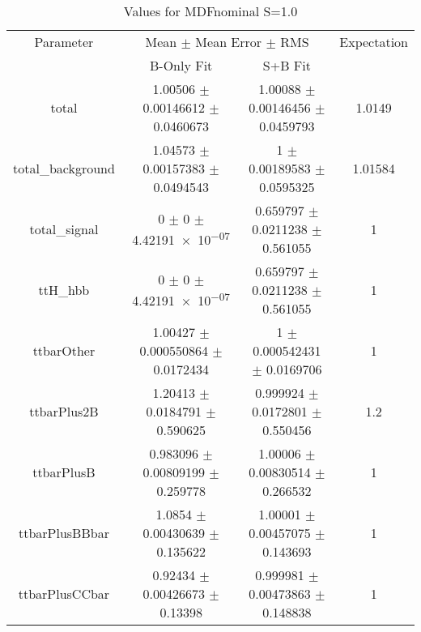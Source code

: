 \begin{table}
\centering
\caption{Values for MDFnominal S=1.0}
\begin{tabular}{cccc}
\toprule
Parameter & \multicolumn{2}{c}{Mean $\pm$ Mean Error $\pm$ RMS} & Expectation\\
 & B-Only Fit & S+B Fit & \\
\midrule
total & \num{1.00506} $\pm$ \num{0.00146612} $\pm$ \num{0.0460673} & \num{1.00088} $\pm$ \num{0.00146456} $\pm$ \num{0.0459793} & \num{1.0149}\\
total\_background & \num{1.04573} $\pm$ \num{0.00157383} $\pm$ \num{0.0494543} & \num{1} $\pm$ \num{0.00189583} $\pm$ \num{0.0595325} & \num{1.01584}\\
total\_signal & \num{0} $\pm$ \num{0} $\pm$ \num{4.42191e-07} & \num{0.659797} $\pm$ \num{0.0211238} $\pm$ \num{0.561055} & \num{1}\\
ttH\_hbb & \num{0} $\pm$ \num{0} $\pm$ \num{4.42191e-07} & \num{0.659797} $\pm$ \num{0.0211238} $\pm$ \num{0.561055} & \num{1}\\
ttbarOther & \num{1.00427} $\pm$ \num{0.000550864} $\pm$ \num{0.0172434} & \num{1} $\pm$ \num{0.000542431} $\pm$ \num{0.0169706} & \num{1}\\
ttbarPlus2B & \num{1.20413} $\pm$ \num{0.0184791} $\pm$ \num{0.590625} & \num{0.999924} $\pm$ \num{0.0172801} $\pm$ \num{0.550456} & \num{1.2}\\
ttbarPlusB & \num{0.983096} $\pm$ \num{0.00809199} $\pm$ \num{0.259778} & \num{1.00006} $\pm$ \num{0.00830514} $\pm$ \num{0.266532} & \num{1}\\
ttbarPlusBBbar & \num{1.0854} $\pm$ \num{0.00430639} $\pm$ \num{0.135622} & \num{1.00001} $\pm$ \num{0.00457075} $\pm$ \num{0.143693} & \num{1}\\
ttbarPlusCCbar & \num{0.92434} $\pm$ \num{0.00426673} $\pm$ \num{0.13398} & \num{0.999981} $\pm$ \num{0.00473863} $\pm$ \num{0.148838} & \num{1}\\
\bottomrule
\end{tabular}
\end{table}